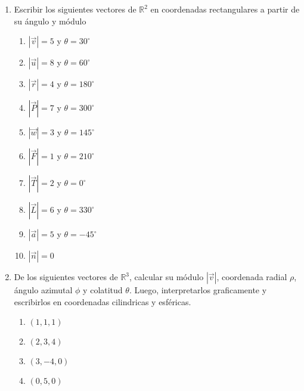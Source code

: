 \documentclass[a4paper]{article}
\newcommand{\exercise}{\item}
\newcommand{\degs}{^{\circ}}
\begin{document}
\begin{enumerate}
	\begin{multicols}{2}
	\begin{enumerate} [label=(\alph*)]
		\item $(1,1)$
		\item $(2,3)$
		\item $(3,-4)$
		\item $(0,5)$
		\item $(-2,1)$
		\item $(-3,-4)$
		\item $(-4,0)$
		\item $(0,0)$
	\end{enumerate}
	\end{multicols}
	\exercise Escribir los siguientes vectores de $\mathbb{R}^2$ en coordenadas rectangulares a partir de su ángulo y módulo
	\begin{multicols}{2}
	\begin{enumerate} [label=(\alph*)]
		\item $\left|\vec{v}\right|=5$ y $\theta=30\degs$
		\item $\left|\vec{u}\right|=8$ y $\theta=60\degs$
		\item $\left|\vec{r}\right|=4$ y $\theta=180\degs$
		\item $\left|\vec{P}\right|=7$ y $\theta=300\degs$
		\item $\left|\vec{w}\right|=3$ y $\theta=145\degs$
		\item $\left|\vec{F}\right|=1$ y $\theta=210\degs$
		\item $\left|\vec{T}\right|=2$ y $\theta=0\degs$
		\item $\left|\vec{L}\right|=6$ y $\theta=330\degs$
		\item $\left|\vec{a}\right|=5$ y $\theta=-45\degs$
		\item $\left|\vec{n}\right|=0$
	\end{enumerate}
	\end{multicols}
	\exercise De los siguientes vectores de $\mathbb{R}^3$, calcular su módulo $|\vec{v}|$, coordenada radial $\rho$, ángulo azimutal $\phi$ y colatitud $\theta$. Luego, interpretarlos graficamente y escribirlos en coordenadas cilindricas y esféricas.
	\begin{multicols}{2}
	\begin{enumerate} [label=(\alph*)]
		\item $(1,1,1)$
		\item $(2,3,4)$
		\item $(3,-4,0)$
		\item $(0,5,0)$

\end{enumerate}
\end{multicols}
\end{enumerate}
\end{document}
